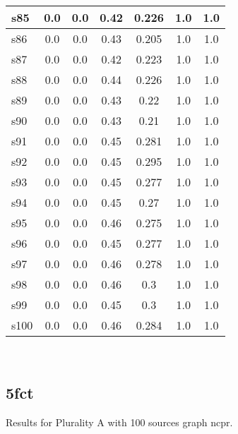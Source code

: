 \documentclass{article}
\begin{document}
\begin{tabular}{|l|c|c|c|c|c|c|}
\hline
s85 &0.0 & 0.0 & 0.42 & 0.226 & 1.0 & 1.0\\
\hline
s86 &0.0 & 0.0 & 0.43 & 0.205 & 1.0 & 1.0\\
\hline
s87 &0.0 & 0.0 & 0.42 & 0.223 & 1.0 & 1.0\\
\hline
s88 &0.0 & 0.0 & 0.44 & 0.226 & 1.0 & 1.0\\
\hline
s89 &0.0 & 0.0 & 0.43 & 0.22 & 1.0 & 1.0\\
\hline
s90 &0.0 & 0.0 & 0.43 & 0.21 & 1.0 & 1.0\\
\hline
s91 &0.0 & 0.0 & 0.45 & 0.281 & 1.0 & 1.0\\
\hline
s92 &0.0 & 0.0 & 0.45 & 0.295 & 1.0 & 1.0\\
\hline
s93 &0.0 & 0.0 & 0.45 & 0.277 & 1.0 & 1.0\\
\hline
s94 &0.0 & 0.0 & 0.45 & 0.27 & 1.0 & 1.0\\
\hline
s95 &0.0 & 0.0 & 0.46 & 0.275 & 1.0 & 1.0\\
\hline
s96 &0.0 & 0.0 & 0.45 & 0.277 & 1.0 & 1.0\\
\hline
s97 &0.0 & 0.0 & 0.46 & 0.278 & 1.0 & 1.0\\
\hline
s98 &0.0 & 0.0 & 0.46 & 0.3 & 1.0 & 1.0\\
\hline
s99 &0.0 & 0.0 & 0.45 & 0.3 & 1.0 & 1.0\\
\hline
s100 &0.0 & 0.0 & 0.46 & 0.284 & 1.0 & 1.0\\
\hline
\end{tabular}\\

\newpage

\subsection{5fct}

\noindent Results for Plurality A with 100 sources graph ncpr.
\end{document}
